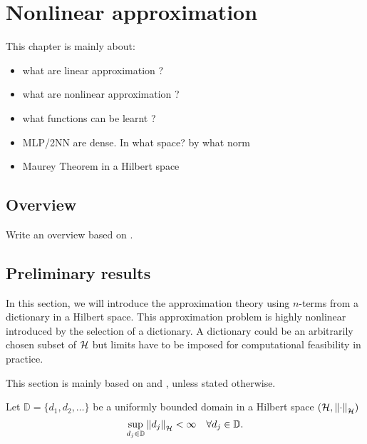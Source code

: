 \chapter{Nonlinear approximation}

This chapter is mainly about:
\begin{itemize}
    \item what are linear approximation ?
    \item what are nonlinear approximation ?
    \item what functions can be learnt ?
    \item MLP/2NN are dense. In what space? by what norm
    \item Maurey Theorem in a Hilbert space
\end{itemize}

\TODO


\section{Overview}

Write an overview based on \cite{devore_1998,pinkusApproximationTheoryMLP1999}.


\section{Preliminary results}
\label{sec:preliminary}





In this section, we will introduce the approximation theory using $n$-terms from
a dictionary in a Hilbert space. This approximation problem is highly nonlinear
introduced by the selection of a dictionary. A dictionary could be an
arbitrarily chosen subset of $\mathcal{H}$ but limits have to be imposed for
computational feasibility in practice. 

This section is mainly based on \cite[Chapter 8]{devore_1998} and
\cite{vandervaartWeakConvergenceEmpirical1996}, unless stated otherwise.

Let $\mathbb{D} = \{d_1,d_2,\dots\}$ be a uniformly bounded domain in a Hilbert
space $(\mathcal{H}, \left\| \cdot \right\|_{\mathcal{H}})$
\begin{equation}
    \sup_{d_j\in \mathbb{D}} \left\| d_j \right\|_{\mathcal{H}} < \infty \quad 
    \forall d_j \in \mathbb{D}.
\end{equation}

